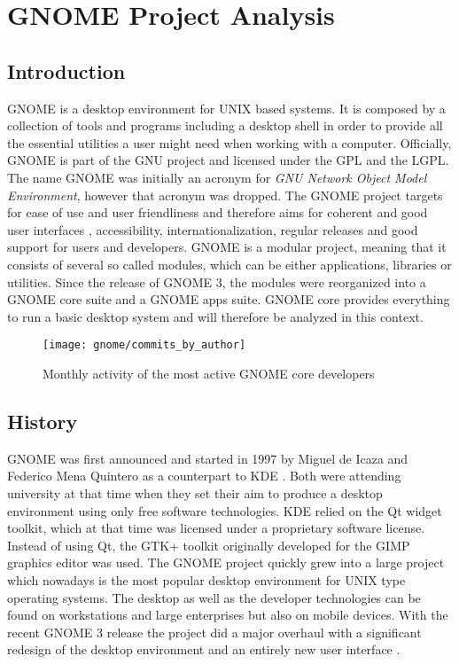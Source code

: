 \section{GNOME Project Analysis} %
\label{sec:GNOME Project Analysis}

\subsection{Introduction} %
\label{sub:Introduction}


GNOME is a desktop environment for UNIX based systems. It is composed by a
collection of tools and programs including a desktop shell in order to provide
all the essential utilities a user might need when working with a computer.
Officially, GNOME is part of the GNU project and licensed under the \ac{GPL}
and the \ac{LGPL}. The name GNOME was initially an acronym for \emph{GNU
Network Object Model Environment}, however that acronym was dropped. The GNOME
project targets for ease of use and user friendliness and therefore aims for
coherent and good user interfaces \cite{GNOMEHIG}, accessibility,
internationalization, regular releases and good support for users and
developers. GNOME is a modular project, meaning that it consists of several so
called modules, which can be either applications, libraries or utilities. Since
the release of GNOME 3, the modules were reorganized into a GNOME core suite
and a GNOME apps suite. GNOME core provides everything to run a basic desktop
system and will therefore be analyzed in this context.

\begin{figure}[htbp]
  \centering
  \texttt{[image: gnome/commits\_by\_author]}
  \caption{Monthly activity of the most active GNOME core developers}
\end{figure}


\subsection{History} %
\label{sub:History}

GNOME was first announced and started in 1997 by Miguel de Icaza and Federico
Mena Quintero as a counterpart to KDE
\cite{German2003,GNOMEAbout,GNOMEAnnouncement}. Both were attending university
at that time when they set their aim to produce a desktop environment using
only free software technologies. KDE relied on the Qt widget toolkit, which at
that time was licensed under a proprietary software license. Instead of using
Qt, the GTK+ toolkit originally developed for the GIMP graphics editor was
used. The GNOME project quickly grew into a large project which nowadays is the
most popular desktop environment for UNIX type operating systems. The desktop
as well as the developer technologies can be found on workstations and large
enterprises but also on mobile devices. With the recent GNOME 3 release the
project did a major overhaul with a significant redesign of the desktop
environment and an entirely new user interface \cite{GNOMEPress}.

